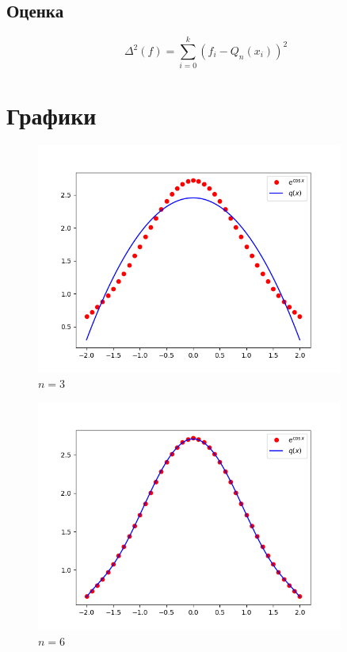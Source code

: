 \documentclass{article}
\begin{document}
\subsection*{Оценка}
\begin{equation*}
     \Delta^2(f) = \sum_{i=0}^{k}(f_i - Q_n(x_i))^2 
\end{equation*}


\section*{Графики}

\begin{figure}[H]
\caption{$n=3$}
\centering
\includegraphics[width=0.9\textwidth]{3}
\end{figure}
\begin{figure}[H]
\caption{$n=6$}
\centering
\includegraphics[width=0.9\textwidth]{6}
\end{figure}
\end{document}

